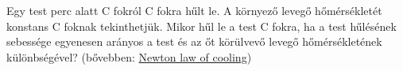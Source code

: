 Egy test  perc alatt  C fokról  C fokra 
hűlt le. A környező levegő hőmérsékletét konstans  C foknak 
tekinthetjük. Mikor hűl le a test  C fokra, ha a test 
hűlésének sebessége egyenesen arányos a test és az őt körülvevő 
levegő hőmérsékletének különbségével? 
(bővebben: \href{https://en.wikipedia.org/wiki/Newton%27s_law_of_cooling}{Newton law of cooling})